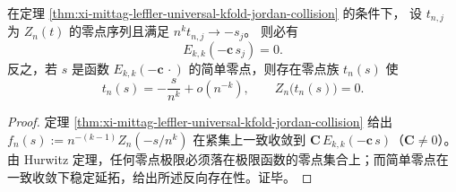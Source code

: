 \begin{corollary}\label{cor:xi-mittag-leffler-kfold-zero-quantization}
在定理 \ref{thm:xi-mittag-leffler-universal-kfold-jordan-collision} 的条件下，
设 \(t_{n,j}\) 为 \(Z_n(t)\) 的零点序列且满足 \(n^k t_{n,j}\to -s_j\)。
则必有
\[
E_{k,k}(-\mathbf c\,s_j)=0.
\]
反之，若 \(s\) 是函数 \(E_{k,k}(-\mathbf c\,\cdot)\) 的简单零点，则存在零点族 \(t_n(s)\) 使
\[
t_n(s)=-\frac{s}{n^k}+o(n^{-k}),
\qquad
Z_n\bigl(t_n(s)\bigr)=0.
\]
\end{corollary}
\begin{proof}
定理 \ref{thm:xi-mittag-leffler-universal-kfold-jordan-collision} 给出
\(
f_n(s):=n^{-(k-1)}Z_n(-s/n^k)
\)
在紧集上一致收敛到 \(\mathbf C\,E_{k,k}(-\mathbf c\,s)\)（\(\mathbf C\neq 0\)）。
由 Hurwitz 定理，任何零点极限必须落在极限函数的零点集合上；而简单零点在一致收敛下稳定延拓，给出所述反向存在性。证毕。
\end{proof}

\endinput
